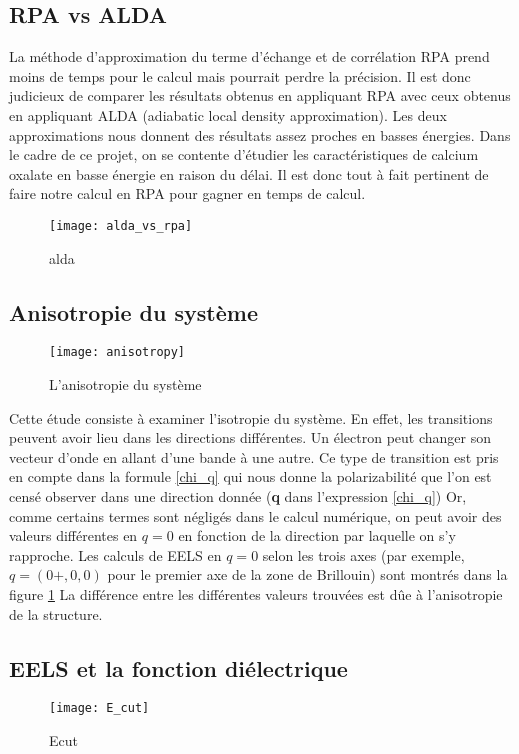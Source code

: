 
\subsection{RPA vs ALDA}
La méthode d'approximation du terme d'échange et de corrélation RPA prend moins de temps pour le calcul mais pourrait perdre la précision. Il est donc judicieux de comparer les résultats obtenus en appliquant RPA avec ceux obtenus en appliquant ALDA (adiabatic local density approximation).
Les deux approximations nous donnent des résultats assez proches en basses énergies.
Dans le cadre de ce projet, on se contente d'étudier les caractéristiques de calcium oxalate en basse énergie en raison du délai.
Il est donc tout à fait pertinent de faire notre calcul en RPA pour gagner en temps de calcul.
\begin{figure}[!h]
    \centering
    \texttt{[image: alda\_vs\_rpa]}
    \caption{alda}
\end{figure}
\subsection{Anisotropie du système}

\begin{figure}[!h]\label{anisotropie}
    \centering
    \texttt{[image: anisotropy]}
    \caption{L'anisotropie du système}
\end{figure}

Cette étude consiste à examiner l'isotropie du système. 
En effet, les transitions peuvent avoir lieu dans les directions différentes. 
Un électron peut changer son vecteur d'onde en allant d'une bande à une autre. 
Ce type de transition est pris en compte dans la formule \ref{chi_q} qui nous donne la polarizabilité que l'on est censé observer dans une direction donnée (\textbf{q} dans l'expression \ref{chi_q})
Or, comme certains termes sont négligés dans le calcul numérique, on peut avoir des valeurs différentes en $q = 0$ en fonction de la direction par laquelle on s'y rapproche.
Les calculs de EELS en $q = 0$ selon les trois axes (par exemple, $q=(0+,0,0)$ pour le premier axe de la zone de Brillouin) sont montrés dans la figure \ref{anisotropie}
La différence entre les différentes valeurs trouvées est dûe à l'anisotropie de la structure.  
\subsection{EELS et la fonction diélectrique}
\begin{figure}[!h]\label{dispersion}
    \centering
    \texttt{[image: E\_cut]}
    \caption{Ecut}
\end{figure}

